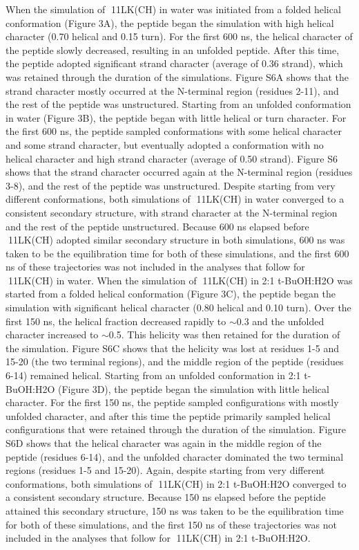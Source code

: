 When the simulation of 11LK(CH) in water was initiated from a folded helical conformation (Figure 3A), the peptide began the simulation with high helical character (0.70 helical and 0.15 turn). For the first 600 ns, the helical character of the peptide slowly decreased, resulting in an unfolded peptide. After this time, the peptide adopted significant strand character (average of 0.36 strand), which was retained through the duration of the simulations. Figure S6A shows that the strand character mostly occurred at the N-terminal region (residues 2-11), and the rest of the peptide was unstructured. Starting from an unfolded conformation in water (Figure 3B), the peptide began with little helical or turn character. For the first 600 ns, the peptide sampled conformations with some helical character and some strand character, but eventually adopted a conformation with no helical character and high strand character (average of 0.50 strand). Figure S6 shows that the strand character occurred again at the N-terminal region (residues 3-8), and the rest of the peptide was unstructured. Despite starting from very different conformations, both simulations of 11LK(CH) in water converged to a consistent secondary structure, with strand character at the N-terminal region and the rest of the peptide unstructured. Because 600 ns elapsed before 11LK(CH) adopted similar secondary structure in both simulations, 600 ns was taken to be the equilibration time for both of these simulations, and the first 600 ns of these trajectories was not included in the analyses that follow for 11LK(CH) in water.
When the simulation of 11LK(CH) in 2:1 t-BuOH:H2O was started from a folded helical conformation (Figure 3C), the peptide began the simulation with significant helical character (0.80 helical and 0.10 turn). Over the first 150 ns, the helical fraction decreased rapidly to $\sim$0.3 and the unfolded character increased to $\sim$0.5. This helicity was then retained for the duration of the simulation. Figure S6C shows that the helicity was lost at residues 1-5 and 15-20 (the two terminal regions), and the middle region of the peptide (residues 6-14) remained helical. Starting from an unfolded conformation in 2:1 t-BuOH:H2O (Figure 3D), the peptide began the simulation with little helical character. For the first 150 ns, the peptide sampled configurations with mostly unfolded character, and after this time the peptide primarily sampled helical configurations that were retained through the duration of the simulation. Figure S6D shows that the helical character was again in the middle region of the peptide (residues 6-14), and the unfolded character dominated the two terminal regions (residues 1-5 and 15-20). Again, despite starting from very different conformations, both simulations of 11LK(CH) in 2:1 t-BuOH:H2O converged to a consistent secondary structure. Because 150 ns elapsed before the peptide attained this secondary structure, 150 ns was taken to be the equilibration time for both of these simulations, and the first 150 ns of these trajectories was not included in the analyses that follow for 11LK(CH) in 2:1 t-BuOH:H2O.
